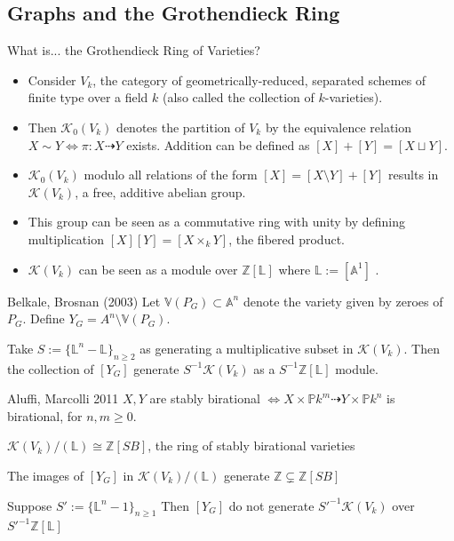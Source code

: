 \documentclass{beamer}
\def\integer{\mathbb{Z}} %
\def\proj{\mathbb{P}} %
\begin{document}
\subsection{Graphs and the Grothendieck Ring}
\begin{frame}{What is... the Grothendieck Ring of Varieties?}
    \begin{itemize}
        \item <1->Consider $V_k$, the category of geometrically-reduced, separated schemes of finite type over a field $k$ (also called the collection of $k$-varieties)\cite{poonen_grothendieck_2002}.
        \item<2->Then $\mathcal{K}_0(V_k)$ denotes the partition of $V_k$ by the equivalence relation $X \sim Y \iff \pi: X \dasharrow Y$ exists. Addition can be defined as $[X] + [Y] = [X \sqcup Y]$.
        \item<2-> $\mathcal{K}_0(V_k)$ modulo all relations of the form $[X] = [X \setminus Y] + [Y]$ results in $\mathcal{K}(V_k)$, a free, additive abelian group.
        \item<3->This group can be seen as a commutative ring with unity by defining multiplication $[X][Y] = [X \times_k Y]$, the fibered product.
        \item<4->$\mathcal{K}(V_k)$ can be seen as a module over $\integer[\mathbb{L}]$ where $\mathbb{L} := [\mathbb{A}^1]$ \cite{aluffi_graph_2011}.
    \end{itemize}
\end{frame}
\begin{frame}{Belkale, Brosnan (2003)}
    Let $\mathbb{V}(P_G) \subset \mathbb{A}^n$ denote the variety given by zeroes of $P_G$. Define $Y_G = A^n \setminus \mathbb{V}(P_G)$.
    \begin{theorem}
        Take $S:= \{\mathbb{L}^n - \mathbb{L}\}_{n \geq 2}$ as generating a multiplicative subset in $\mathcal{K}(V_k)$. Then the collection of $[Y_G]$ generate $S^{-1}\mathcal{K}(V_k)$ as a $S^{-1}\integer[\mathbb{L}]$ module.
    \end{theorem}
\end{frame}
\begin{frame}{Aluffi, Marcolli 2011}
    $X, Y$ are stably birational $\iff X \times \proj k^m \dasharrow Y \times \proj k^n$ is birational, for $n, m \geq 0$.
    \begin{theorem}
        $\mathcal{K}(V_k)/(\mathbb{L}) \cong \integer[SB]$, the ring of stably birational varieties
    \end{theorem}
    \begin{theorem}
        The images of $[Y_G]$ in $\mathcal{K}(V_k)/(\mathbb{L})$ generate $\integer \subsetneq \integer[SB]$
    \end{theorem}
    \begin{corollary}
        Suppose $S':= \{\mathbb{L}^n - 1\}_{n \geq 1}$ Then $[Y_G]$ do not generate $S'^{-1}\mathcal{K}(V_k)$ over $S'^{-1}\integer[\mathbb{L}]$
    \end{corollary}
\end{frame}
\end{document}

